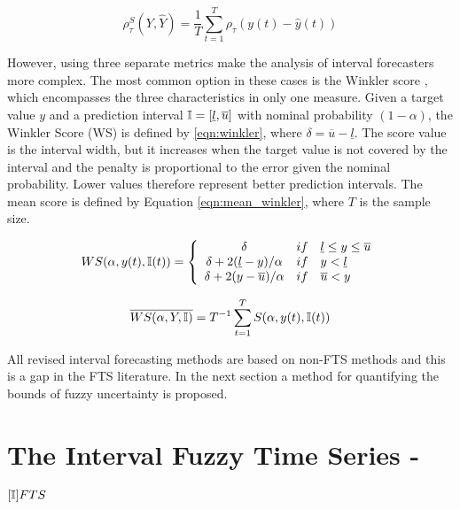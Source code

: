 \begin{equation}
\rho_\tau^S(Y,\hat{Y}) = \frac{1}{T}\sum_{t=1}^T \rho_\tau(y(t) - \hat{y}(t))
\label{eqn:pinball_score}
\end{equation}

However, using three separate metrics make the analysis of interval forecasters more complex. The most common option in these cases is the Winkler score \cite{winklerscore}, which encompasses the three characteristics in only one measure. Given a target value $y$ and a prediction interval $\mathbb{I} = [\underline{l},\overline{u}{]}$ with nominal probability $(1 - \alpha)$, the Winkler Score (WS) is defined by  \eqref{eqn:winkler}, where $\delta = \overline{u} - \underline{l}$. The score value is the interval width, but it increases when the target value is not covered by the interval and the penalty is proportional to the error given the nominal probability. Lower values therefore represent better prediction intervals. The mean score is defined by Equation \eqref{eqn:mean_winkler}, where $T$ is the sample size.

\begin{equation}
WS(\alpha, y(t), \mathbb{I}(t)) = \left\{ \begin{array}{ccl}
\delta & if & \underline{l} \leq y \leq \overline{u} \\
\delta + 2(\underline{l} - y)/\alpha & if & y < \underline{l}  \\
\delta + 2(y - \overline{u})/\alpha & if & \overline{u} < y   
\end{array} \right.
\label{eqn:winkler}
\end{equation}

\begin{equation}
\overline{WS(\alpha, Y, \mathbb{I})} = T^{-1} \sum_{t=1}^T S(\alpha, y(t),\mathbb{I}(t))
\label{eqn:mean_winkler}
\end{equation}

All revised interval forecasting methods are based on non-FTS methods and this is a gap in the FTS literature. In the next section a method for quantifying the bounds of fuzzy uncertainty is proposed.

%
\section{The Interval Fuzzy Time Series  - $\ifts$}\index{$\ifts$}
\label{sec:ifts}

